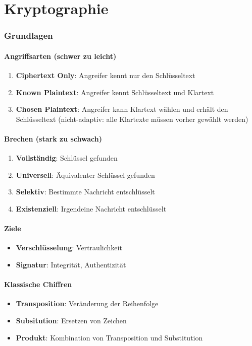 \documentclass{article}
\author{Leopold Lemmermann}
\begin{document}
\createtitle


\part{Kryptographie}
\section{Grundlagen}
\subsection{Angriffsarten (schwer zu leicht)}
\begin{enumerate}
  \item \textbf{Ciphertext Only}: Angreifer kennt nur den Schlüsseltext
  \item \textbf{Known Plaintext}: Angreifer kennt Schlüsseltext und Klartext
  \item \textbf{Chosen Plaintext}: Angreifer kann Klartext wählen und erhält den Schlüsseltext (nicht-adaptiv: alle Klartexte müssen vorher gewählt werden)
\end{enumerate}

\subsection{Brechen (stark zu schwach)}
\begin{enumerate}
  \item \textbf{Vollständig}: Schlüssel gefunden
  \item \textbf{Universell}: Äquivalenter Schlüssel gefunden
  \item \textbf{Selektiv}: Bestimmte Nachricht entschlüsselt
  \item \textbf{Existenziell}: Irgendeine Nachricht entschlüsselt
\end{enumerate}

\subsection{Ziele}
\begin{itemize}
  \item \textbf{Verschlüsselung}: Vertraulichkeit
  \item \textbf{Signatur}: Integrität, Authentizität
\end{itemize}

\subsection{Klassische Chiffren}
\begin{itemize}
  \item \textbf{Transposition}: Veränderung der Reihenfolge
  \item \textbf{Subsitution}: Ersetzen von Zeichen
  \item \textbf{Produkt}: Kombination von Transposition und Substitution
\end{itemize}
\end{document}
